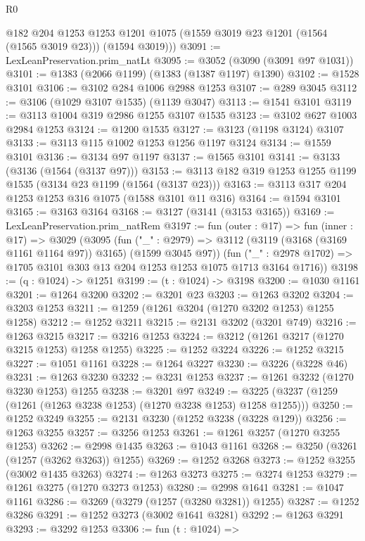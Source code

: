 \begin{lexlean}{R0}
\begin{coremodule}
        @182
        @204
        @1253
        @1253
        @1201
        @1075
        (@1559 @3019 @23 @1201 (@1564 (@1565 @3019 @23)))
        (@1594 @3019)))
@3091 := LexLeanPreservation.prim_natLt
@3095 := @3052 (@3090 (@3091 @97 @1031))
@3101 := @1383 (@2066 @1199) (@1383 (@1387 @1197) @1390)
@3102 := @1528 @3101
@3106 := @3102 @284 @1006 @2988 @1253
@3107 := @289 @3045
@3112 := @3106 (@1029 @3107 @1535) (@1139 @3047)
@3113 := @1541 @3101
@3119 := @3113 @1004 @319 @2986 @1255 @3107 @1535
@3123 := @3102 @627 @1003 @2984 @1253
@3124 := @1200 @1535
@3127 := @3123 (@1198 @3124) @3107
@3133 := @3113 @115 @1002 @1253 @1256 @1197 @3124
@3134 := @1559 @3101
@3136 := @3134 @97 @1197
@3137 := @1565 @3101
@3141 := @3133 (@3136 (@1564 (@3137 @97)))
@3153 := @3113 @182 @319 @1253 @1255 @1199 @1535 (@3134 @23 @1199 (@1564 (@3137 @23)))
@3163 := @3113 @317 @204 @1253 @1253 @316 @1075 (@1588 @3101 @11 @316)
@3164 := @1594 @3101
@3165 := @3163 @3164
@3168 := @3127 (@3141 (@3153 @3165))
@3169 := LexLeanPreservation.prim_natRem
@3197 := fun (outer : @17) =>
  fun (inner : @17) =>
  @3029
    (@3095
      (fun ("_" : @2979) => @3112 (@3119 (@3168 (@3169 @1161 @1164 @97)) @3165) (@1599 @3045 @97))
      (fun ("_" : @2978 @1702) => @1705 @3101 @303 @13 @204 @1253 @1253 @1075 @1713 @3164 @1716))
@3198 := (q : @1024) -> @1251
@3199 := (t : @1024) -> @3198
@3200 := @1030 @1161
@3201 := @1264 @3200
@3202 := @3201 @23
@3203 := @1263 @3202
@3204 := @3203 @1253
@3211 := @1259 (@1261 @3204 (@1270 @3202 @1253) @1255 @1258)
@3212 := @1252 @3211
@3215 := @2131 @3202 (@3201 @749)
@3216 := @1263 @3215
@3217 := @3216 @1253
@3224 := @3212 (@1261 @3217 (@1270 @3215 @1253) @1258 @1255)
@3225 := @1252 @3224
@3226 := @1252 @3215
@3227 := @1051 @1161
@3228 := @1264 @3227
@3230 := @3226 (@3228 @46)
@3231 := @1263 @3230
@3232 := @3231 @1253
@3237 := @1261 @3232 (@1270 @3230 @1253) @1255
@3238 := @3201 @97
@3249 := @3225 (@3237 (@1259 (@1261 (@1263 @3238 @1253) (@1270 @3238 @1253) @1258 @1255)))
@3250 := @1252 @3249
@3255 := @2131 @3230 (@1252 @3238 (@3228 @129))
@3256 := @1263 @3255
@3257 := @3256 @1253
@3261 := @1261 @3257 (@1270 @3255 @1253)
@3262 := @2998 @1435
@3263 := @1043 @1161
@3268 := @3250 (@3261 (@1257 (@3262 @3263)) @1255)
@3269 := @1252 @3268
@3273 := @1252 @3255 (@3002 @1435 @3263)
@3274 := @1263 @3273
@3275 := @3274 @1253
@3279 := @1261 @3275 (@1270 @3273 @1253)
@3280 := @2998 @1641
@3281 := @1047 @1161
@3286 := @3269 (@3279 (@1257 (@3280 @3281)) @1255)
@3287 := @1252 @3286
@3291 := @1252 @3273 (@3002 @1641 @3281)
@3292 := @1263 @3291
@3293 := @3292 @1253
@3306 := fun (t : @1024) =>

\end{coremodule}
\end{lexlean}
